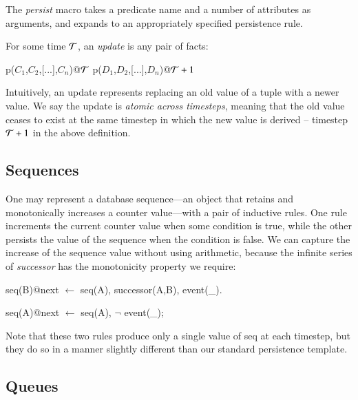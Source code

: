 The \emph{persist} macro takes a predicate name and a number of attributes as arguments, 
and expands to an appropriately specified persistence rule.

%
For some time $\Tau$, an {\em update} is any pair of facts:

\begin{Dedalus}
p\nega(\(C_1\),\(C_2\),[...],\(C_n\))@\(\Tau\) 
p\pos(\(D_1\),\(D_2\),[...],\(D_n\))@\(\Tau+1\)
\end{Dedalus}
%

Intuitively, an update represents replacing an old value of a tuple with a
newer value.  We say the update is {\em atomic across timesteps}, meaning that
the old value ceases to exist at the same timestep in which the new value
is derived -- timestep $\Tau+1$ in the above definition.

\subsection{Sequences}
One may represent a database sequence---an object that retains and monotonically increases a counter value---with a pair of inductive rules.  One rule increments the current counter value when some condition is 
true, while the other persists the value of the sequence when the condition is false.  We can capture the increase
of the sequence value without using arithmetic, because the infinite series of \emph{successor} has the monotonicity
property we require:

\begin{Dedalus}
seq(B)@next \(\leftarrow\) seq(A), successor(A,B), event(_).
  
seq(A)@next \(\leftarrow\) seq(A), \(\lnot\) event(_);
\end{Dedalus}

Note that these two rules produce only a single value of seq at each timestep, but they do so in a manner slightly different than our standard persistence template.


\subsection{Queues}


